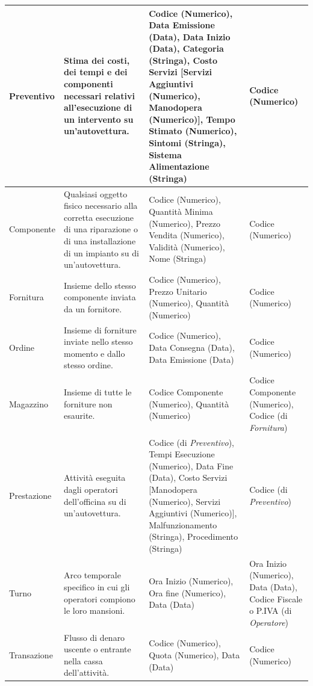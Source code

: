{\begin{longtable}{| p{2cm} | p{4cm} | p{4cm} | p{2cm} |}
				Preventivo &
				Stima dei costi, dei tempi e dei componenti necessari relativi all’esecuzione di un intervento su un’autovettura. &
				Codice (Numerico), Data Emissione (Data), Data Inizio (Data), Categoria (Stringa), Costo Servizi [Servizi Aggiuntivi (Numerico), Manodopera (Numerico)], Tempo Stimato (Numerico), Sintomi (Stringa), Sistema Alimentazione (Stringa) &
				Codice (Numerico)
				\\ \hline

				Componente &
				Qualsiasi oggetto fisico necessario alla corretta esecuzione di una riparazione o di una installazione di un impianto su di un’autovettura. &
				Codice (Numerico), Quantità Minima (Numerico), Prezzo Vendita (Numerico), Validità (Numerico), Nome (Stringa) &
				Codice (Numerico)
				\\ \hline

				Fornitura &
				Insieme dello stesso componente inviata da un fornitore. &
				Codice (Numerico), Prezzo Unitario (Numerico), Quantità (Numerico) &
				Codice (Numerico)
				\\ \hline

				Ordine &
				Insieme di forniture inviate nello stesso momento e dallo stesso ordine. &
				Codice (Numerico), Data Consegna (Data), Data Emissione (Data) &
				Codice (Numerico)
				\\ \hline
				
				Magazzino &
				Insieme di tutte le forniture non esaurite. &
				Codice Componente (Numerico), Quantità (Numerico) &
				Codice Componente (Numerico), Codice (di \emph{Fornitura})
				\\ \hline

				Prestazione &
				Attività eseguita dagli operatori dell’officina su di un’autovettura. &
				Codice (di \emph{Preventivo}), Tempi Esecuzione (Numerico), Data Fine (Data), Costo Servizi [Manodopera (Numerico), Servizi Aggiuntivi (Numerico)], Malfunzionamento (Stringa), Procedimento (Stringa) &
				Codice (di \emph{Preventivo})
				\\ \hline

				Turno &
				Arco temporale specifico in cui gli operatori compiono le loro mansioni. &
				Ora Inizio (Numerico), Ora fine (Numerico), Data (Data) &
				Ora Inizio (Numerico), Data (Data), Codice Fiscale o P.IVA (di \emph{Operatore})
				\\ \hline

				Transazione &
				Flusso di denaro uscente o entrante nella cassa dell’attività. &
				Codice (Numerico), Quota (Numerico), Data (Data) &
				Codice (Numerico)
				\\ \hline


\end{longtable}}
